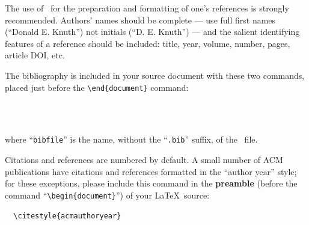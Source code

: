 \documentclass[
acmsmall,
nonacm,
screen,
acmthm]{../templates/acmart}
\begin{document}
The use of ~for the preparation and formatting of one's references is
strongly recommended. Authors' names should be complete --- use full
first names (``Donald E. Knuth'') not initials (``D. E. Knuth'') --- and
the salient identifying features of a reference should be included:
title, year, volume, number, pages, article DOI, etc.

The bibliography is included in your source document with these two
commands, placed just before the
\texttt{\textbackslash{}end\{document\}} command:

\begin{verbatim}
  
  
\end{verbatim}

where ``\texttt{bibfile}'' is the name, without the ``\texttt{.bib}''
suffix, of the ~file.

Citations and references are numbered by default. A small number of ACM
publications have citations and references formatted in the ``author
year'' style; for these exceptions, please include this command in the
\textbf{preamble} (before the command
``\texttt{\textbackslash{}begin\{document\}}'') of your LaTeX~source:

\begin{verbatim}
  \citestyle{acmauthoryear}
\end{verbatim}
\end{document}
